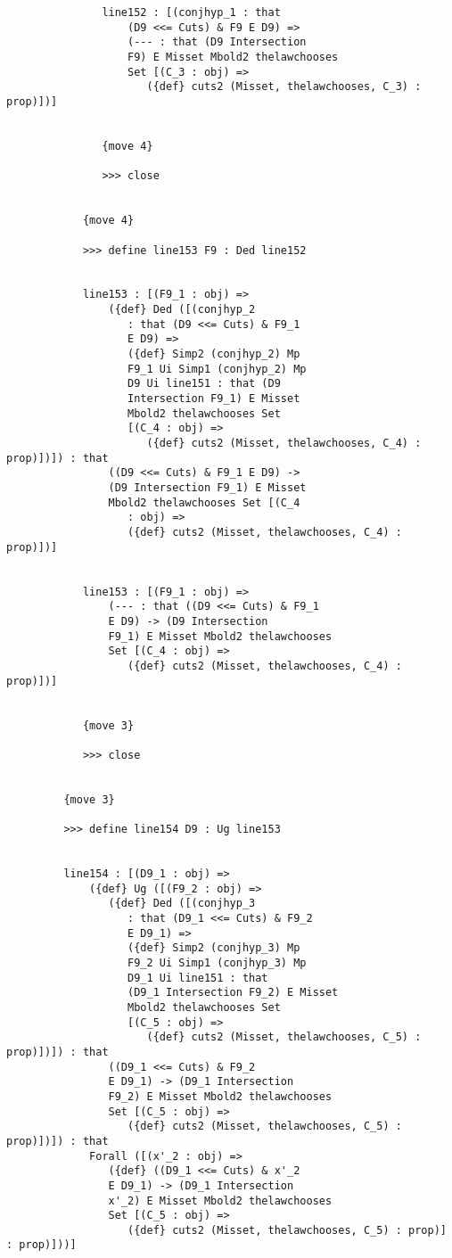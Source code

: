 \documentclass[12pt]{article}
\begin{document}
\begin{verbatim}
               line152 : [(conjhyp_1 : that 
                   (D9 <<= Cuts) & F9 E D9) => 
                   (--- : that (D9 Intersection 
                   F9) E Misset Mbold2 thelawchooses 
                   Set [(C_3 : obj) => 
                      ({def} cuts2 (Misset, thelawchooses, C_3) : prop)])]


               {move 4}

               >>> close


            {move 4}

            >>> define line153 F9 : Ded line152


            line153 : [(F9_1 : obj) => 
                ({def} Ded ([(conjhyp_2 
                   : that (D9 <<= Cuts) & F9_1 
                   E D9) => 
                   ({def} Simp2 (conjhyp_2) Mp 
                   F9_1 Ui Simp1 (conjhyp_2) Mp 
                   D9 Ui line151 : that (D9 
                   Intersection F9_1) E Misset 
                   Mbold2 thelawchooses Set 
                   [(C_4 : obj) => 
                      ({def} cuts2 (Misset, thelawchooses, C_4) : prop)])]) : that 
                ((D9 <<= Cuts) & F9_1 E D9) -> 
                (D9 Intersection F9_1) E Misset 
                Mbold2 thelawchooses Set [(C_4 
                   : obj) => 
                   ({def} cuts2 (Misset, thelawchooses, C_4) : prop)])]


            line153 : [(F9_1 : obj) => 
                (--- : that ((D9 <<= Cuts) & F9_1 
                E D9) -> (D9 Intersection 
                F9_1) E Misset Mbold2 thelawchooses 
                Set [(C_4 : obj) => 
                   ({def} cuts2 (Misset, thelawchooses, C_4) : prop)])]


            {move 3}

            >>> close


         {move 3}

         >>> define line154 D9 : Ug line153


         line154 : [(D9_1 : obj) => 
             ({def} Ug ([(F9_2 : obj) => 
                ({def} Ded ([(conjhyp_3 
                   : that (D9_1 <<= Cuts) & F9_2 
                   E D9_1) => 
                   ({def} Simp2 (conjhyp_3) Mp 
                   F9_2 Ui Simp1 (conjhyp_3) Mp 
                   D9_1 Ui line151 : that 
                   (D9_1 Intersection F9_2) E Misset 
                   Mbold2 thelawchooses Set 
                   [(C_5 : obj) => 
                      ({def} cuts2 (Misset, thelawchooses, C_5) : prop)])]) : that 
                ((D9_1 <<= Cuts) & F9_2 
                E D9_1) -> (D9_1 Intersection 
                F9_2) E Misset Mbold2 thelawchooses 
                Set [(C_5 : obj) => 
                   ({def} cuts2 (Misset, thelawchooses, C_5) : prop)])]) : that 
             Forall ([(x'_2 : obj) => 
                ({def} ((D9_1 <<= Cuts) & x'_2 
                E D9_1) -> (D9_1 Intersection 
                x'_2) E Misset Mbold2 thelawchooses 
                Set [(C_5 : obj) => 
                   ({def} cuts2 (Misset, thelawchooses, C_5) : prop)] : prop)]))]



\end{verbatim}
\end{document}
